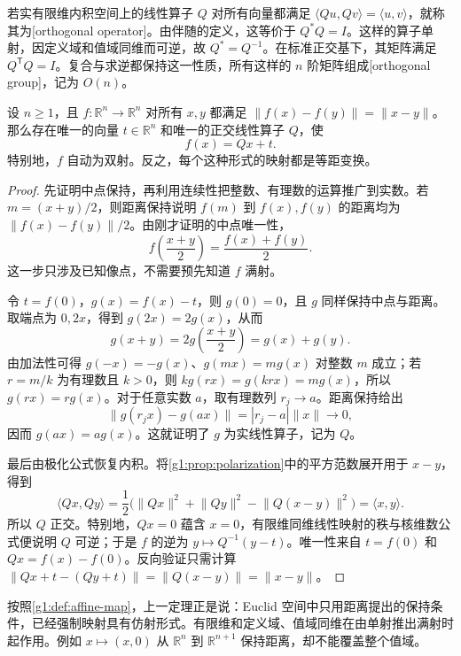 \ProseParagraphBreak

若实有限维内积空间上的线性算子 \(Q\) 对所有向量都满足 \(\langle Qu,Qv\rangle=\langle u,v\rangle\)，就称其为[orthogonal operator]。由伴随的定义，这等价于 \(Q^*Q=I\)。这样的算子单射，因定义域和值域同维而可逆，故 \(Q^*=Q^{-1}\)。在标准正交基下，其矩阵满足 \(Q^{\mathsf T}Q=I\)。复合与求逆都保持这一性质，所有这样的 \(n\) 阶矩阵组成[orthogonal group]，记为 \(O(n)\)。

\begin{theorem}
	\label{g1:thm:isometry-affine}
	设 \(n\geq 1\)，且 \(f\colon\mathbb R^n\rightarrow\mathbb R^n\) 对所有 \(x,y\) 都满足 \(\lVert f(x)-f(y)\rVert=\lVert x-y\rVert\)。那么存在唯一的向量 \(t\in\mathbb R^n\) 和唯一的正交线性算子 \(Q\)，使
	\[
		f(x)=Qx+t.
	\]
	特别地，\(f\) 自动为双射。反之，每个这种形式的映射都是等距变换。
\end{theorem}

\begin{proof}
	先证明中点保持，再利用连续性把整数、有理数的运算推广到实数。若 \(m=(x+y)/2\)，则距离保持说明 \(f(m)\) 到 \(f(x),f(y)\) 的距离均为 \(\lVert f(x)-f(y)\rVert/2\)。由刚才证明的中点唯一性，
	\[
		f\left(\frac{x+y}{2}\right)=\frac{f(x)+f(y)}2.
	\]
	这一步只涉及已知像点，不需要预先知道 \(f\) 满射。

	令 \(t=f(0)\)，\(g(x)=f(x)-t\)，则 \(g(0)=0\)，且 \(g\) 同样保持中点与距离。取端点为 \(0,2x\)，得到 \(g(2x)=2g(x)\)，从而
	\[
		g(x+y)=2g\left(\frac{x+y}{2}\right)=g(x)+g(y).
	\]
	由加法性可得 \(g(-x)=-g(x)\)、\(g(mx)=mg(x)\) 对整数 \(m\) 成立；若 \(r=m/k\) 为有理数且 \(k>0\)，则 \(kg(rx)=g(krx)=mg(x)\)，所以 \(g(rx)=rg(x)\)。对于任意实数 \(a\)，取有理数列 \(r_j\rightarrow a\)。距离保持给出
	\[
		\lVert g(r_jx)-g(ax)\rVert=|r_j-a|\lVert x\rVert\longrightarrow 0,
	\]
	因而 \(g(ax)=ag(x)\)。这就证明了 \(g\) 为实线性算子，记为 \(Q\)。

	最后由极化公式恢复内积。将\cref{g1:prop:polarization}中的平方范数展开用于 \(x-y\)，得到
	\[
		\langle Qx,Qy\rangle
		=\frac12\bigl(\lVert Qx\rVert^2+\lVert Qy\rVert^2
		-\lVert Q(x-y)\rVert^2\bigr)
		=\langle x,y\rangle.
	\]
	所以 \(Q\) 正交。特别地，\(Qx=0\) 蕴含 \(x=0\)，有限维同维线性映射的秩与核维数公式便说明 \(Q\) 可逆；于是 \(f\) 的逆为 \(y\mapsto Q^{-1}(y-t)\)。唯一性来自 \(t=f(0)\) 和 \(Qx=f(x)-f(0)\)。反向验证只需计算 \(\lVert Qx+t-(Qy+t)\rVert=\lVert Q(x-y)\rVert=\lVert x-y\rVert\)。
\end{proof}

按照\cref{g1:def:affine-map}，上一定理正是说：Euclid 空间中只用距离提出的保持条件，已经强制映射具有仿射形式。有限维和定义域、值域同维在由单射推出满射时起作用。例如 \(x\mapsto(x,0)\) 从 \(\mathbb R^n\) 到 \(\mathbb R^{n+1}\) 保持距离，却不能覆盖整个值域。


